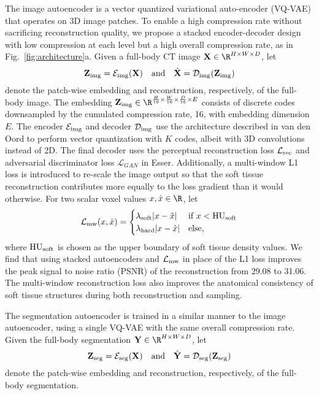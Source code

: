 The image autoencoder is a vector quantized variational auto-encoder (VQ-VAE) that operates on 3D image patches. To enable a high compression rate without sacrificing reconstruction quality,\cite{esser2020taming} we propose a stacked encoder-decoder design with low compression at each level but a high overall compression rate, as in Fig.~\ref{fig:architecture}a. Given a full-body CT image $\mathbf{X} \in \R^{H \times W \times D}$, let
\begin{equation}
  \label{eq:7}
  \mathbf{Z}_{\rm img} = \mathcal{E}_{\rm img}(\mathbf{X}) \text{~~~and~~~}
  \hat{\mathbf{X}} = \mathcal{D}_{\rm img}(\mathbf{Z}_{\mathrm{img}})
\end{equation} denote the patch-wise embedding and reconstruction, respectively, of the full-body image. The embedding $\mathbf{Z}_{\rm img}\in \R^{\frac{H}{16} \times \frac{W}{16} \times \frac{D}{16} \times E}$ consists of discrete codes downsampled by the cumulated compression rate, 16, with embedding dimension $E$.
The encoder $\mathcal{E}_{\rm img}$ and decoder $\mathcal{D}_{\rm img}$ use the architecture described in van den Oord \etal\cite{van2017neural} to perform vector quantization with $K$ codes, albeit with 3D convolutions instead of 2D. The final decoder uses the perceptual reconstruction loss $\mathcal{L}_{\rm rec}$ and adversarial discriminator loss $\mathcal{L}_{GAN}$ in Esser.\etal\cite{esser2020taming} Additionally, a multi-window L1 loss is introduced to re-scale the image output so that the soft tissue reconstruction contributes more equally to the loss gradient than it would otherwise. For two scalar voxel values $x, \hat{x} \in \R$, let
\begin{equation}
  \label{eq:8}
  \mathcal{L}_{\rm mw}(x, \hat{x}) =
  \begin{cases}
    \lambda_{\rm soft} |x - \hat{x}| & \text{if } x < \text{HU}_{\rm soft}\\
    \lambda_{\rm hard} |x - \hat{x}| & \text{else},
  \end{cases}
\end{equation}
where $\text{HU}_{\rm soft}$ is chosen as the upper boundary of soft tissue density values. We find that using stacked autoencoders and $\mathcal{L}_{\rm mw}$ in place of the L1 loss improves the peak signal to noise ratio (PSNR) of the reconstruction from 29.08 to 31.06.
The multi-window reconstruction loss also improves the anatomical consistency of soft tissue structures during both reconstruction and sampling.

The segmentation autoencoder is trained in a similar manner to the image autoencoder, using a single VQ-VAE with the same overall compression rate.
Given the full-body segmentation $\mathbf{Y} \in \R^{H \times W \times D}$, let
\begin{equation}
  \label{eq:9}
  \mathbf{Z}_{\rm seg} = \mathcal{E}_{\rm seg}(\mathbf{X}) \text{~~~and~~~}
  \hat{\mathbf{Y}} = \mathcal{D}_{\rm seg}(\mathbf{Z}_{\mathrm{seg}})
\end{equation} denote the patch-wise embedding and reconstruction, respectively, of the full-body segmentation.

